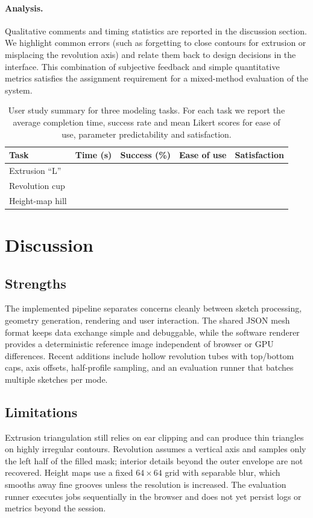 \documentclass[11pt, a4paper]{article}
\begin{document}
\paragraph{Analysis.} Qualitative comments and timing statistics are reported in the discussion section. We highlight common errors (such as forgetting to close contours for extrusion or misplacing the revolution axis) and relate them back to design decisions in the interface. This combination of subjective feedback and simple quantitative metrics satisfies the assignment requirement for a mixed-method evaluation of the system.

\begin{table}[t]
    \centering
    \caption{User study summary for three modeling tasks. For each task we report the average completion time, success rate and mean Likert scores for ease of use, parameter predictability and satisfaction.}
    \label{tab:userstudy}
    \begin{tabular}{lcccc}
        \toprule
        Task & Time (s) & Success (\%) & Ease of use & Satisfaction \\
        \midrule
        Extrusion ``L''      &  &  &  &  \\
        Revolution cup       &  &  &  &  \\
        Height-map hill      &  &  &  &  \\
        \bottomrule
    \end{tabular}
\end{table}

\section{Discussion}
\subsection{Strengths}
The implemented pipeline separates concerns cleanly between sketch processing, geometry generation, rendering and user interaction. The shared JSON mesh format keeps data exchange simple and debuggable, while the software renderer provides a deterministic reference image independent of browser or GPU differences. Recent additions include hollow revolution tubes with top/bottom caps, axis offsets, half-profile sampling, and an evaluation runner that batches multiple sketches per mode.

\subsection{Limitations}
Extrusion triangulation still relies on ear clipping and can produce thin triangles on highly irregular contours. Revolution assumes a vertical axis and samples only the left half of the filled mask; interior details beyond the outer envelope are not recovered. Height maps use a fixed $64\times64$ grid with separable blur, which smooths away fine grooves unless the resolution is increased. The evaluation runner executes jobs sequentially in the browser and does not yet persist logs or metrics beyond the session.
\end{document}
